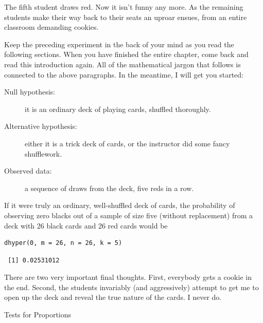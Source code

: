\documentclass[captions=tableheading]{scrbook}
\begin{document}
The fifth student draws red. Now it isn't funny any more. As the remaining students make their way back to their seats an uproar ensues, from an entire classroom demanding cookies.

\bigskip{}

Keep the preceding experiment in the back of your mind as you read the following sections. When you have finished the entire chapter, come back and read this introduction again. All of the mathematical jargon that follows is connected to the above paragraphs. In the meantime, I will get you started:

\begin{description}
\item[Null hypothesis:] it is an ordinary deck of playing cards, shuffled thoroughly.
\item[Alternative hypothesis:] either it is a trick deck of cards, or the instructor did some fancy shufflework.
\item[Observed data:] a sequence of draws from the deck, five reds in a row.
\end{description}

If it were truly an ordinary, well-shuffled deck of cards, the probability of observing zero blacks out of a sample of size five (without replacement) from a deck with 26 black cards and 26 red cards would be


\begin{verbatim}
dhyper(0, m = 26, n = 26, k = 5)
\end{verbatim}

\begin{verbatim}
 [1] 0.02531012
\end{verbatim}

There are two very important final thoughts. First, everybody gets a cookie in the end. Second, the students invariably (and aggressively) attempt to get me to open up the deck and reveal the true nature of the cards. I never do.


Tests for Proportions
\label{sec:Tests-for-Proportions}
\end{document}
